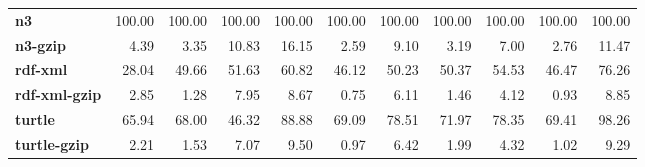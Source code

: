 \begin{table}[h!]
\begin{tabular}{lrrrrrrrrrr}
\textbf{n3                    } &   100.00 &   100.00 &      100.00 &    100.00 &          100.00 & 100.00 &      100.00 &  100.00 &          100.00 &     100.00 \\
\textbf{n3-gzip               } &     4.39 &     3.35 &       10.83 &     16.15 &            2.59 &   9.10 &        3.19 &    7.00 &            2.76 &      11.47 \\
\textbf{rdf-xml               } &    28.04 &    49.66 &       51.63 &     60.82 &           46.12 &  50.23 &       50.37 &   54.53 &           46.47 &      76.26 \\
\textbf{rdf-xml-gzip          } &     2.85 &     1.28 &        7.95 &      8.67 &            0.75 &   6.11 &        1.46 &    4.12 &            0.93 &       8.85 \\
\textbf{turtle                } &    65.94 &    68.00 &       46.32 &     88.88 &           69.09 &  78.51 &       71.97 &   78.35 &           69.41 &      98.26 \\
\textbf{turtle-gzip           } &     2.21 &     1.53 &        7.07 &      9.50 &            0.97 &   6.42 &        1.99 &    4.32 &            1.02 &       9.29 \\
\bottomrule
\end{tabular}
\end{table}
